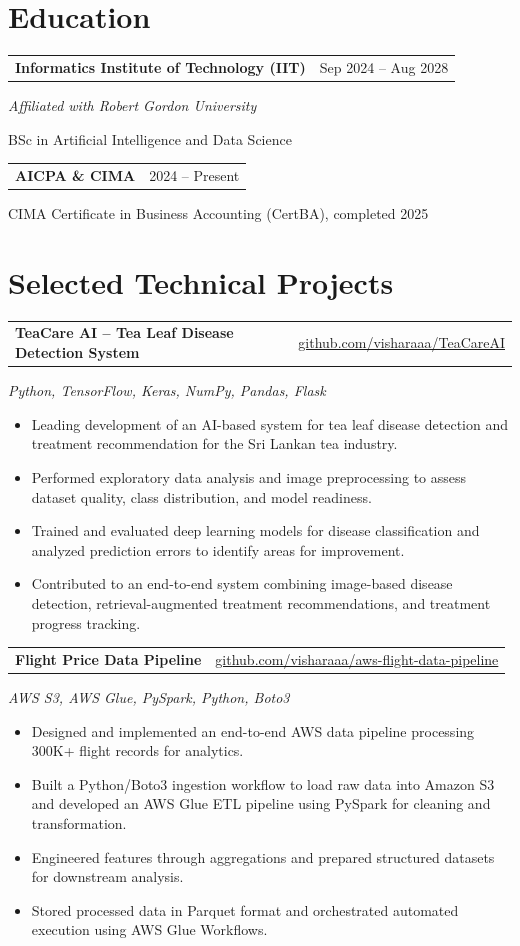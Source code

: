\documentclass[10pt,a4paper]{article}
\makeatletter
\newcommand{\entry}[2]{
  \vspace{2pt}
  \begin{tabular*}{\textwidth}{@{}l@{\extracolsep{\fill}}r@{}}
    \textbf{#1} & #2 \\
  \end{tabular*}
}
\newcommand{\subentry}[1]{
  \textit{#1}\vspace{-1pt}
}
\makeatother
\begin{document}

\section*{Education}

\entry{Informatics Institute of Technology (IIT)}{Sep 2024 -- Aug 2028}
\subentry{Affiliated with Robert Gordon University}
BSc in Artificial Intelligence and Data Science

\entry{AICPA \& CIMA}{2024 -- Present}
CIMA Certificate in Business Accounting (CertBA), completed 2025


\section*{Selected Technical Projects}

\entry{TeaCare AI -- Tea Leaf Disease Detection System}
{\href{https://github.com/visharaaa/TeaCareAI}{github.com/visharaaa/TeaCareAI}}
\subentry{Python, TensorFlow, Keras, NumPy, Pandas, Flask}
\begin{itemize}
    \item Leading development of an AI-based system for tea leaf disease detection and treatment recommendation for the Sri Lankan tea industry.
    \item Performed exploratory data analysis and image preprocessing to assess dataset quality, class distribution, and model readiness.
    \item Trained and evaluated deep learning models for disease classification and analyzed prediction errors to identify areas for improvement.
    \item Contributed to an end-to-end system combining image-based disease detection, retrieval-augmented treatment recommendations, and treatment progress tracking.
\end{itemize}

\entry{Flight Price Data Pipeline}
{\href{https://github.com/visharaaa/aws-flight-data-pipeline}{github.com/visharaaa/aws-flight-data-pipeline}}
\subentry{AWS S3, AWS Glue, PySpark, Python, Boto3}
\begin{itemize}
    \item Designed and implemented an end-to-end AWS data pipeline processing 300K+ flight records for analytics.
    \item Built a Python/Boto3 ingestion workflow to load raw data into Amazon S3 and developed an AWS Glue ETL pipeline using PySpark for cleaning and transformation.
    \item Engineered features through aggregations and prepared structured datasets for downstream analysis.
    \item Stored processed data in Parquet format and orchestrated automated execution using AWS Glue Workflows.
\end{itemize}
\end{document}
